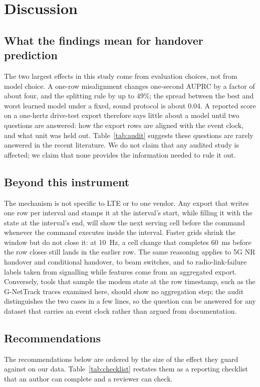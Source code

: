 \documentclass[5p,times,twocolumn]{elsarticle}
\begin{document}
\section{Discussion}
\label{sec:discussion}

\subsection{What the findings mean for handover prediction}
The two largest effects in this study come from evaluation choices, not from model choice. A one-row misalignment changes one-second AUPRC by a factor of about four, and the splitting rule by up to 49\%; the spread between the best and worst learned model under a fixed, sound protocol is about 0.04. A reported score on a one-hertz drive-test export therefore says little about a model until two questions are answered: how the export rows are aligned with the event clock, and what unit was held out. Table~\ref{tab:audit} suggests these questions are rarely answered in the recent literature. We do not claim that any audited study is affected; we claim that none provides the information needed to rule it out.

\subsection{Beyond this instrument}
The mechanism is not specific to LTE or to one vendor. Any export that writes one row per interval and stamps it at the interval's start, while filling it with the state at the interval's end, will show the next serving cell before the command whenever the command executes inside the interval. Faster grids shrink the window but do not close it: at 10~Hz, a cell change that completes 60~ms before the row closes still lands in the earlier row. The same reasoning applies to 5G NR handover and conditional handover, to beam switches, and to radio-link-failure labels taken from signalling while features come from an aggregated export. Conversely, tools that sample the modem state at the row timestamp, such as the G-NetTrack traces examined here, should show no aggregation step; the audit distinguishes the two cases in a few lines, so the question can be answered for any dataset that carries an event clock rather than argued from documentation.

\subsection{Recommendations}
The recommendations below are ordered by the size of the effect they guard against on our data. Table~\ref{tab:checklist} restates them as a reporting checklist that an author can complete and a reviewer can check.
\end{document}

